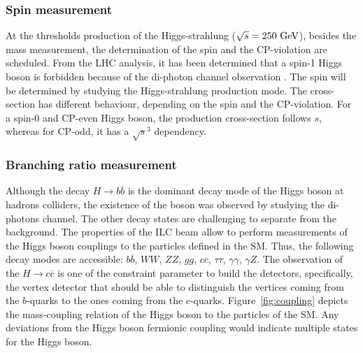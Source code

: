     \subsubsection{Spin measurement}

    At the thresholds production of the Higgs-strahlung ($\sqrt{s} = 250~\rm{GeV}$), besides the mass measurement, the determination of the spin and the CP-violation are scheduled.
    From the \gls{LHC} analysis, it has been determined that a spin-1 Higgs boson is forbidden because of the di-photon channel observation \cite{TheATLASCollaboration2013}.
    The spin will be determined by studying the Higgs-strahlung production mode.
    The cross-section has different behaviour, depending on the spin and the CP-violation.
    For a spin-0 and CP-even Higgs boson, the production cross-section follows $s$, whereas for CP-odd, it has a $\sqrt{s}^3$ dependency.

    \subsubsection{Branching ratio measurement}

    Although the decay $H \rightarrow b\overline{b}$ is the dominant decay mode of the Higgs boson at hadrons colliders, the existence of the boson was observed by studying the di-photons channel.
    The other decay states are challenging to separate from the background.
    The properties of the \gls{ILC} beam allow to perform measurements of the Higgs boson couplings to the particles defined in the \gls{SM}.
    Thus, the following decay modes are accessible: $b\overline{b}$, $WW$, $ZZ$, $gg$, $c\overline{c}$, $\tau \tau$, $\gamma \gamma$, $\gamma Z$.
    The observation of the $H \rightarrow c\overline{c}$ is one of the constraint parameter to build the detectors, specifically, the vertex detector that should be able to distinguish the vertices coming from the $b$-quarks to the ones coming from the $c$-quarks.
    Figure~\ref{fig:coupling} depicts the mass-coupling relation of the Higgs boson to the particles of the \gls{SM}.
    Any deviations from the Higgs boson fermionic coupling would indicate multiple states for the Higgs boson.

